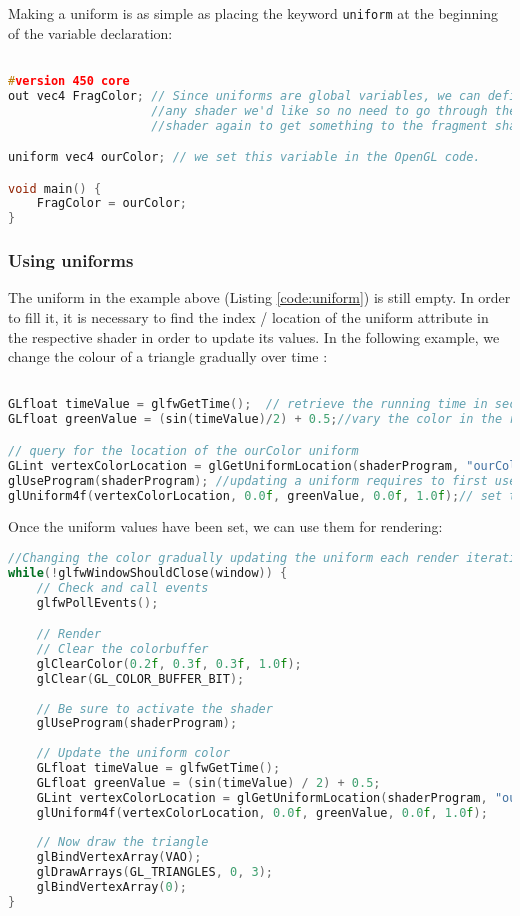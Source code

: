 Making a uniform is as simple as placing the keyword \verb|uniform| at the beginning of the variable declaration:
\begin{lstlisting}[language=C++, caption={Uniform}, label={code:uniform}]

#version 450 core
out vec4 FragColor; // Since uniforms are global variables, we can define them in 
					//any shader we'd like so no need to go through the vertex 
					//shader again to get something to the fragment shader.

uniform vec4 ourColor; // we set this variable in the OpenGL code.

void main() {
	FragColor = ourColor;
} 
\end{lstlisting}

\subsubsection{Using uniforms}

The uniform in the example above (Listing \ref{code:uniform}) is still empty. In order to fill it, it is necessary to find the index / location of the uniform attribute in the respective \gls{shader} in order to update its values. In the following example, we change the colour of a triangle gradually over time \cite{learnopengl}:

\begin{lstlisting}[language=C++, caption={Using uniforms}, label={code:uniform-usage}]

GLfloat timeValue = glfwGetTime();	// retrieve the running time in seconds
GLfloat greenValue = (sin(timeValue)/2) + 0.5;//vary the color in the range of 0.0 - 1.0

// query for the location of the ourColor uniform
GLint vertexColorLocation = glGetUniformLocation(shaderProgram, "ourColor"); 
glUseProgram(shaderProgram); //updating a uniform requires to first use the program
glUniform4f(vertexColorLocation, 0.0f, greenValue, 0.0f, 1.0f);// set the uniform value
\end{lstlisting}

Once the uniform values have been set, we can use them for rendering:
\begin{lstlisting}[language=C++, caption={Using uniforms for rendering}, label={code:uniform-rendering}]
//Changing the color gradually updating the uniform each render iteration
while(!glfwWindowShouldClose(window)) {
	// Check and call events
	glfwPollEvents();

	// Render
	// Clear the colorbuffer
	glClearColor(0.2f, 0.3f, 0.3f, 1.0f);
	glClear(GL_COLOR_BUFFER_BIT);
	
	// Be sure to activate the shader
	glUseProgram(shaderProgram);
	
	// Update the uniform color
	GLfloat timeValue = glfwGetTime();
	GLfloat greenValue = (sin(timeValue) / 2) + 0.5;
	GLint vertexColorLocation = glGetUniformLocation(shaderProgram, "ourColor");
	glUniform4f(vertexColorLocation, 0.0f, greenValue, 0.0f, 1.0f);
	
	// Now draw the triangle
	glBindVertexArray(VAO);
	glDrawArrays(GL_TRIANGLES, 0, 3);
	glBindVertexArray(0);
}
\end{lstlisting}

